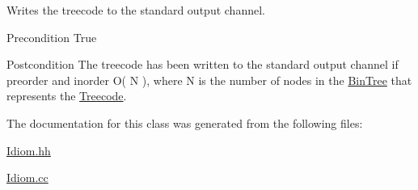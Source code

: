Writes the treecode to the standard output channel. 

\begin{DoxyPrecond}{Precondition}
True 
\end{DoxyPrecond}
\begin{DoxyPostcond}{Postcondition}
The treecode has been written to the standard output channel if preorder and inorder  O( N ), where N is the number of nodes in the \hyperlink{classBinTree}{Bin\+Tree} that represents the \hyperlink{classTreecode}{Treecode}. 
\end{DoxyPostcond}


The documentation for this class was generated from the following files\+:\begin{DoxyCompactItemize}
\item 
\hyperlink{Idiom_8hh}{Idiom.\+hh}\item 
\hyperlink{Idiom_8cc}{Idiom.\+cc}\end{DoxyCompactItemize}
